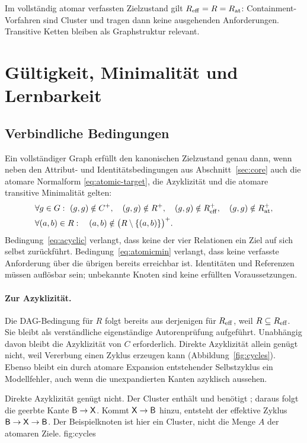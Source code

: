 Im vollständig atomar verfassten Zielzustand gilt $R_{\mathrm{eff}}=R=R_{\mathrm{at}}$:
Containment-Vorfahren sind Cluster und tragen dann keine ausgehenden
Anforderungen. Transitive Ketten bleiben als Graphstruktur relevant.

\FloatBarrier
\section{Gültigkeit, Minimalität und Lernbarkeit}
\label{sec:validity}
\subsection{Verbindliche Bedingungen}
Ein vollständiger Graph erfüllt den kanonischen Zielzustand genau dann,
wenn neben den Attribut- und Identitätsbedingungen aus
Abschnitt~\ref{sec:core} auch die atomare Normalform
\eqref{eq:atomic-target}, die Azyklizität und die atomare transitive
Minimalität gelten:
\begin{align}
 &\forall g\in G:\ (g,g)\notin C^+,\quad (g,g)\notin R^+,
                  \quad (g,g)\notin R_{\mathrm{eff}}^+,\quad
                  (g,g)\notin R_{\mathrm{at}}^+,\label{eq:acyclic}\\
 &\forall(a,b)\in R:\quad
      (a,b)\notin\bigl(R\setminus\{(a,b)\}\bigr)^+.
      \label{eq:atomicmin}
\end{align}
Bedingung~\eqref{eq:acyclic} verlangt, dass keine der vier Relationen ein
Ziel auf sich selbst zurückführt. Bedingung~\eqref{eq:atomicmin} verlangt,
dass keine verfasste Anforderung über die übrigen bereits erreichbar ist.
Identitäten und Referenzen müssen auflösbar sein; unbekannte
Knoten sind keine erfüllten Voraussetzungen.

\paragraph{Zur Azyklizität.}
Die DAG-Bedingung für $R$ folgt bereits aus derjenigen für $R_{\mathrm{eff}}$, weil
$R\subseteq R_{\mathrm{eff}}$. Sie bleibt als verständliche eigenständige
Autorenprüfung aufgeführt. Unabhängig davon bleibt die Azyklizität von $C$
erforderlich. Direkte Azyklizität allein genügt nicht, weil Vererbung einen
Zyklus erzeugen kann (Abbildung~\ref{fig:cycles}). Ebenso bleibt ein
durch atomare Expansion entstehender Selbstzyklus ein Modellfehler,
auch wenn die unexpandierten Kanten azyklisch aussehen.

{Direkte Azyklizität genügt nicht. Der Cluster  enthält  und
benötigt ; daraus folgt die geerbte Kante $\mathsf{B}\to\mathsf{X}$. Kommt
$\mathsf{X}\to\mathsf{B}$ hinzu, entsteht der effektive Zyklus
$\mathsf{B}\to\mathsf{X}\to\mathsf{B}$. Der Beispielknoten  ist hier ein Cluster,
nicht die Menge $A$ der atomaren Ziele.}
{fig:cycles}

